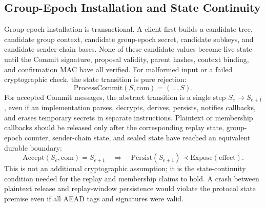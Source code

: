 \documentclass[preprint,12pt]{elsarticle}
\theoremstyle{definition}
\renewcommand{\mathsf}[1]{\mathrm{#1}}
\begin{document}
\subsection{Group-Epoch Installation and State Continuity}

Group-epoch installation is transactional. A client first builds a candidate tree,
candidate group context, candidate group-epoch secret, candidate subkeys, and
candidate sender-chain bases. None of these candidate values become live state
until the Commit signature, proposal validity, parent hashes, context binding,
and confirmation MAC have all verified. For malformed input or a failed
cryptographic check, the state transition is pure rejection:
\begin{equation}
  \mathsf{ProcessCommit}(S,\mathsf{com})=(\bot,S).
  \label{eq:group-reject-no-state}
\end{equation}
For accepted Commit messages, the abstract transition is a single step
$S_e\rightarrow S_{e+1}$, even if an implementation parses, decrypts, derives,
persists, notifies callbacks, and erases temporary secrets in separate
instructions. Plaintext or membership callbacks should be released only after
the corresponding replay state, group-epoch counter, sender-chain state, and sealed
state have reached an equivalent durable boundary:
\begin{equation}
  \mathsf{Accept}(S_e,\mathsf{com})=S_{e+1}
  \quad\Longrightarrow\quad
  \mathsf{Persist}(S_{e+1})\prec \mathsf{Expose}(\mathrm{effect}).
  \label{eq:group-atomic-accept}
\end{equation}
This is not an additional cryptographic assumption; it is the state-continuity
condition needed for the replay and membership claims to hold. A crash between
plaintext release and replay-window persistence would
violate the protocol state premise even if all AEAD tags and signatures were
valid.
\end{document}
